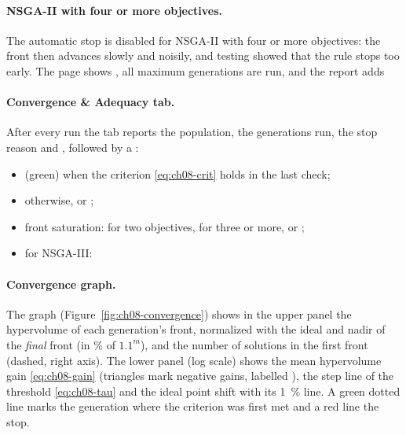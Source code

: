 \paragraph{NSGA-II with four or more objectives.} The automatic stop is disabled for NSGA-II with four or more
objectives: the front then advances slowly and noisily, and testing showed that the rule stops too early. The page
shows , all maximum generations are run, and the report adds 

\paragraph{Convergence \& Adequacy tab.} After every run the tab reports the population, the generations run, the
stop reason and , followed by a :
\begin{itemize}
  \item {} (green)
        when the criterion \eqref{eq:ch08-crit} holds in the last check;
  \item {} otherwise, or ;
  \item front saturation:  for two
        objectives,  for three or more, or ;
  \item for NSGA-III: 
\end{itemize}

\paragraph{Convergence graph.} The graph  (Figure~\ref{fig:ch08-convergence}) shows
in the upper panel the hypervolume of each generation's front, normalized with the ideal and nadir of the
\emph{final} front (in \% of $1.1^m$), and the number of solutions in the first front (dashed, right axis). The
lower panel (log scale) shows the mean hypervolume gain \eqref{eq:ch08-gain} (triangles mark negative gains,
labelled ), the step line of the threshold \eqref{eq:ch08-tau} and the ideal point shift
with its 1~\% line. A green dotted line marks the generation where the criterion was first met and a red line the
stop.


